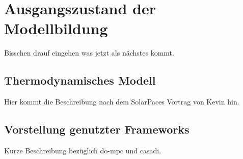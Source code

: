 \chapter{Ausgangszustand der Modellbildung} \label{ch_Ausgangszustand}
Bisschen drauf eingehen was jetzt als nächstes kommt.

\section{Thermodynamisches Modell} \label{sec_ThermodynamischesModell}
Hier kommt die Beschreibung nach dem SolarPaces Vortrag von Kevin hin.

\section{Vorstellung genutzter Frameworks} \label{sec_Frameworks}
Kurze Beschreibung bezüglich do-mpc und casadi.